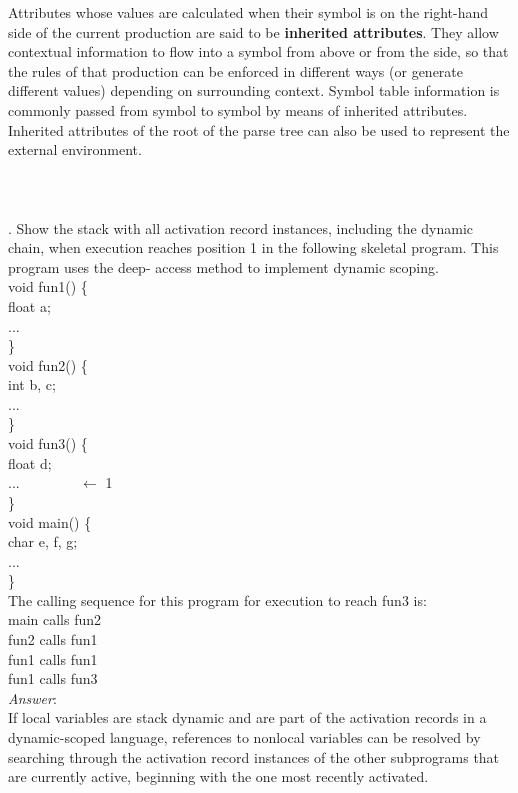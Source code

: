 \documentclass[a4paper,12pt]{article}
\begin{document}
Attributes whose values are calculated when their symbol is on the right-hand side of the current production are said to be \textbf{inherited attributes}. They allow contextual information to flow into a symbol from above or from the side, so that the rules of that production can be enforced in different ways (or generate different values) depending on surrounding context. Symbol table information is commonly passed from symbol to symbol by means of inherited attributes. Inherited attributes of the root of the parse tree can also be used to represent the external environment.\\
\\
\\
\\
. Show the stack with all activation record instances, including the dynamic chain, when
execution reaches position 1 in the following skeletal program. This program uses the deep-
access method to implement dynamic scoping.\\
void fun1() \{\\
float a;\\
...\\
\}\\
void fun2() \{\\
int b, c;\\
...\\
\}\\
void fun3() \{\\
float d;\\
... \verb+       + $\longleftarrow$ 1\\
\}\\
void main() \{\\
char e, f, g;\\
...\\
\}\\
The calling sequence for this program for execution to reach fun3 is:\\
main calls fun2\\
fun2 calls fun1\\
fun1 calls fun1\\
fun1 calls fun3\\
\emph{Answer}:\\
If local variables are stack dynamic and are part of the activation records in a
dynamic-scoped language, references to nonlocal variables can be resolved by
searching through the activation record instances of the other subprograms
that are currently active, beginning with the one most recently activated.
\end{document}

